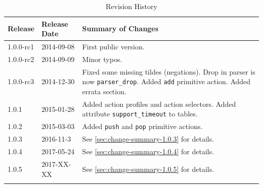 \documentclass[12pt]{article}
\begin{document}
\begin{table}[H]
\begin{center}
\begin{tabular}{| l | l | p{} |} \hline
\textbf{Release} &
\textbf{Release Date} &
\textbf{Summary of Changes} \\  \hline
1.0.0-rc1 & 2014-09-08 & First public version. \\  \hline
1.0.0-rc2 & 2014-09-09 & Minor typos. \\  \hline
1.0.0-rc3 & 2014-12-30 & Fixed some missing tildes (negations). Drop in parser is now \texttt{parser_drop}. Added \texttt{add} primitive action. Added errata section. \\  \hline
1.0.1 & 2015-01-28 & Added action profiles and action selectors. Added attribute \texttt{support_timeout} to tables. \\  \hline
1.0.2 & 2015-03-03 & Added \texttt{push} and \texttt{pop} primitive actions. \\  \hline
1.0.3 & 2016-11-3 & See \ref{sec:change-summary-1.0.3} for details. \\ \hline
1.0.4 & 2017-05-24 & See \ref{sec:change-summary-1.0.4} for details. \\ \hline
1.0.5 & 2017-XX-XX & See \ref{sec:change-summary-1.0.5} for details. \\ \hline
}
\end{tabular}
\end{center}
\caption{Revision History}
\label{tab:revhistory}
\end{table}

\end{document}
